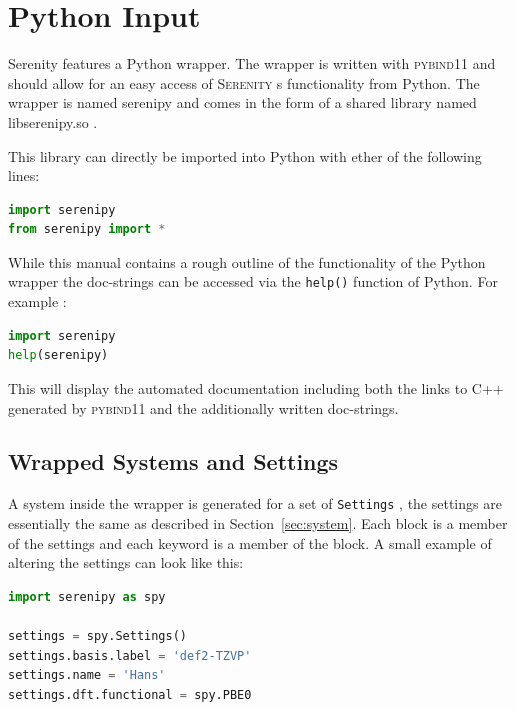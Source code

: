 \documentclass[bibliography=totocnumbered,a4paper,10pt,oneside]{scrbook}
\newcommand{
\serenity}{\textsc{Serenity}\xspace}
\newcommand{\ttt}[1]{%
  \begingroup\setlength{\fboxsep}{1pt}%
  \colorbox{serenity-green!30}{\texttt{\hspace*{2pt}\vphantom{(g}#1\hspace*{2pt}}}%
  \endgroup
}
\begin{document}

\clearpage
\chapter{Python Input}
Serenity features a Python wrapper.
The wrapper is written with \textsc{pybind11}\cite{pybind11} and should allow for an easy access of \serenity s functionality from Python.
The wrapper is named serenipy and comes in the form of a shared library named libserenipy.so .

This library can directly be imported into Python with ether of the following lines:
\begin{lstlisting}[language=Python]
import serenipy
from serenipy import *
\end{lstlisting}
While this manual contains a rough outline of the functionality of the Python wrapper the doc-strings can be accessed via the
\texttt{help()} function of Python. For example :
\begin{lstlisting}[language=Python]
import serenipy
help(serenipy)
\end{lstlisting}
This will display the automated documentation including both the links to C++ generated by \textsc{pybind11} and the additionally written doc-strings.
\section{Wrapped Systems and Settings}
A system inside the wrapper is generated for a set of \ttt{Settings},
the settings are essentially the same as described in Section~\ref{sec:system}.
Each block is a member of the settings and each keyword is a member of the block.
A small example of altering the settings can look like this:
\begin{lstlisting}[language=Python]
import serenipy as spy

settings = spy.Settings()
settings.basis.label = 'def2-TZVP'
settings.name = 'Hans'
settings.dft.functional = spy.PBE0
\end{lstlisting}
\end{document}
